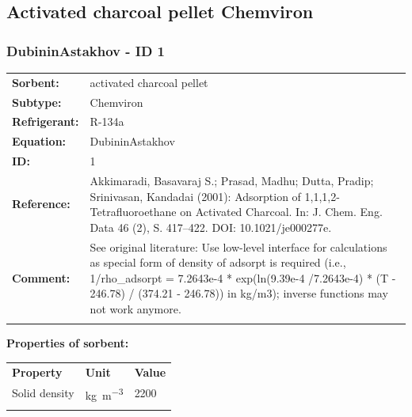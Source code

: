 \subsection{Activated charcoal pellet Chemviron}
%
\subsubsection{DubininAstakhov - ID 1}
%
\begin{tabular}[l]{|lp{11.5cm}|}
\hline
\addlinespace

\textbf{Sorbent:} & activated charcoal pellet \\
\textbf{Subtype:} & Chemviron \\
\textbf{Refrigerant:} & R-134a \\
\textbf{Equation:} & DubininAstakhov \\
\textbf{ID:} & 1 \\
\textbf{Reference:} & Akkimaradi, Basavaraj S.; Prasad, Madhu; Dutta, Pradip; Srinivasan, Kandadai (2001): Adsorption of 1,1,1,2-Tetrafluoroethane on Activated Charcoal. In: J. Chem. Eng. Data 46 (2), S. 417–422. DOI: 10.1021/je000277e. \\
\textbf{Comment:} & See original literature: Use low-level interface for calculations as special form of density of adsorpt is required (i.e., 1/rho\_adsorpt = 7.2643e-4 * exp(ln(9.39e-4 /7.2643e-4) * (T - 246.78) / (374.21 - 246.78)) in kg/m3); inverse functions may not work anymore. \\

\addlinespace
\hline
\end{tabular}
\newline

\textbf{Properties of sorbent:}
\newline
%
\begin{longtable}[l]{lll}
\toprule
\addlinespace
\textbf{Property} & \textbf{Unit} & \textbf{Value} \\
\addlinespace
\midrule
\endhead
\bottomrule
\endfoot
\bottomrule
\endlastfoot
\addlinespace

Solid density & \si{\kilogram\per\cubic\meter} & 2200\\

\addlinespace\end{longtable}

